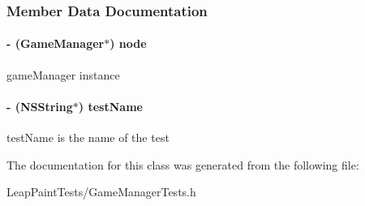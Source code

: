 \subsubsection{Member Data Documentation}
\hypertarget{interface_game_manager_tests_af0831d60fcbb503cc3660bc53c5ebb32}{
\paragraph[{node}]{\setlength{\rightskip}{0pt plus 5cm}-\/ ({\bf Game\-Manager}$\ast$) node\hspace{0.3cm}{\ttfamily [protected]}}}\label{d2/d7d/interface_game_manager_tests_af0831d60fcbb503cc3660bc53c5ebb32}
game\-Manager instance \hypertarget{interface_game_manager_tests_a094b37dc4161bb858dde0d046fbce83d}{
\paragraph[{test\-Name}]{\setlength{\rightskip}{0pt plus 5cm}-\/ (N\-S\-String$\ast$) test\-Name\hspace{0.3cm}{\ttfamily [protected]}}}\label{d2/d7d/interface_game_manager_tests_a094b37dc4161bb858dde0d046fbce83d}
test\-Name is the name of the test 

The documentation for this class was generated from the following file\-:\begin{DoxyCompactItemize}
\item 
Leap\-Paint\-Tests/Game\-Manager\-Tests.\-h\end{DoxyCompactItemize}
